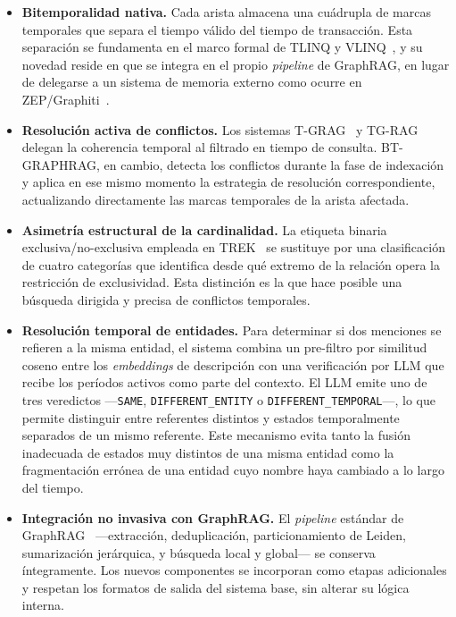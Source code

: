 \begin{itemize}
    \item \textbf{Bitemporalidad nativa.} Cada arista almacena una cuádrupla de marcas temporales que separa el tiempo válido del tiempo de transacción. Esta separación se fundamenta en el marco formal de TLINQ y VLINQ~\cite{tlinq2022}, y su novedad reside en que se integra en el propio \emph{pipeline} de GraphRAG, en lugar de delegarse a un sistema de memoria externo como ocurre en ZEP/Graphiti~\cite{zep2025}.
    \item \textbf{Resolución activa de conflictos.} Los sistemas T-GRAG~\cite{tgrag2025} y TG-RAG~\cite{tg_rag2025} delegan la coherencia temporal al filtrado en tiempo de consulta. BT-GRAPHRAG, en cambio, detecta los conflictos durante la fase de indexación y aplica en ese mismo momento la estrategia de resolución correspondiente, actualizando directamente las marcas temporales de la arista afectada.
    \item \textbf{Asimetría estructural de la cardinalidad.} La etiqueta binaria exclusiva/no-exclusiva empleada en TREK~\cite{trek2025} se sustituye por una clasificación de cuatro categorías que identifica desde qué extremo de la relación opera la restricción de exclusividad. Esta distinción es la que hace posible una búsqueda dirigida y precisa de conflictos temporales.
    \item \textbf{Resolución temporal de entidades.} Para determinar si dos menciones se refieren a la misma entidad, el sistema combina un pre-filtro por similitud coseno entre los \emph{embeddings} de descripción con una verificación por LLM que recibe los períodos activos como parte del contexto. El LLM emite uno de tres veredictos —\texttt{SAME}, \texttt{DIFFERENT\_ENTITY} o \texttt{DIFFERENT\_TEMPORAL}—, lo que permite distinguir entre referentes distintos y estados temporalmente separados de un mismo referente. Este mecanismo evita tanto la fusión inadecuada de estados muy distintos de una misma entidad como la fragmentación errónea de una entidad cuyo nombre haya cambiado a lo largo del tiempo.
    \item \textbf{Integración no invasiva con GraphRAG.} El \emph{pipeline} estándar de GraphRAG~\cite{edge2024local} ---extracción, deduplicación, particionamiento de Leiden, sumarización jerárquica, y búsqueda local y global--- se conserva íntegramente. Los nuevos componentes se incorporan como etapas adicionales y respetan los formatos de salida del sistema base, sin alterar su lógica interna.
\end{itemize}

